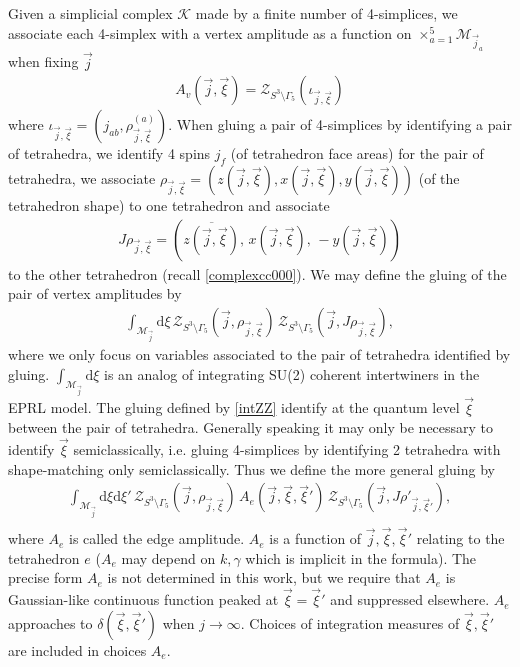 \documentclass[aps,prd,notitlepage,nofootinbib,superscriptaddress,groupedaddress,twocolumn]{revtex4-1}
\def\be{\begin{eqnarray}}
\def\ee{\end{eqnarray}}
\newcommand{\ck}{\mathcal K}
\newcommand{\cm}{\mathcal M}
\newcommand{\rmd}{\mathrm d}
\begin{document}
Given a simplicial complex $\ck$ made by a finite number of 4-simplices, we associate each 4-simplex with a vertex amplitude as a function on $\times_{a=1}^5 {\cm}_{\vec{j}_a}$ when fixing $\vec{j}$
\be
A_v(\vec{j},\vec{\xi})=\mathcal{Z}_{S^{3} \setminus \Gamma_{5}}(\iota_{\vec{j}, \vec{\xi}})
\ee 
where $\iota_{\vec{j}, \vec{\xi}}=({j}_{ab},\rho^{(a)}_{\vec{j},\vec{\xi}})$. When gluing a pair of 4-simplices by identifying a pair of tetrahedra, we identify 4 spins $j_{f}$ (of tetrahedron face areas) for the pair of tetrahedra, we associate $\rho_{\vec{j},\vec{\xi}}=(z(\vec{j}, \vec{\xi}), x(\vec{j}, \vec{\xi}), y(\vec{j}, \vec{\xi}))$ (of the tetrahedron shape) to one tetrahedron and associate 
\be
J\rho_{\vec{j},\vec{\xi}}=\left(\overline{z(\vec{j}, \vec{\xi})},\, x(\vec{j}, \vec{\xi}),\, -y(\vec{j}, \vec{\xi})\right)
\ee
to the other tetrahedron (recall \eqref{complexcc000}). We may define the gluing of the pair of vertex amplitudes by
\be
\int_{{\cm}_{\vec{j}}}\rmd \xi\,\mathcal{Z}_{S^{3} \setminus \Gamma_{5}}(\vec{j},\rho_{\vec{j},\vec{\xi}})\,\mathcal{Z}_{S^{3} \setminus \Gamma_{5}}(\vec{j},J\rho_{\vec{j},\vec{\xi}}),\label{intZZ}
\ee
where we only focus on variables associated to the pair of tetrahedra identified by gluing. $\int_{{\cm}_{\vec{j}}}\rmd \xi$ is an analog of integrating SU(2) coherent intertwiners in the EPRL model. The gluing defined by \eqref{intZZ} identify at the quantum level $\vec{\xi}$ between the pair of tetrahedra. Generally speaking it may only be necessary to identify $\vec{\xi}$ semiclassically, i.e. gluing 4-simplices by identifying 2 tetrahedra with shape-matching only semiclassically. Thus we define the more general gluing by  
\be
\int_{{\cm}_{\vec{j}}}\rmd \xi\rmd\xi'\,\mathcal{Z}_{S^{3} \setminus \Gamma_{5}}(\vec{j},\rho_{\vec{j},\vec{\xi}})\, A_e(\vec{j},\vec{\xi},\vec{\xi}')\, \mathcal{Z}_{S^{3} \setminus \Gamma_{5}}(\vec{j},J\rho'_{\vec{j},\vec{\xi}'}),\nonumber\\\label{intZZgen}
\ee
where $A_e$ is called the edge amplitude. $A_e$ is a function of $\vec{j},\vec{\xi},\vec{\xi}'$ relating to the tetrahedron $e$ ($A_e$ may depend on $k,\gamma$ which is implicit in the formula). The precise form $A_e$ is not determined in this work, but we require that $A_e$ is Gaussian-like continuous function peaked at $\vec{\xi}=\vec{\xi}'$ and suppressed elsewhere. $A_e$ approaches to $\delta(\vec{\xi},\vec{\xi}') $ when $j\to\infty$. Choices of integration measures of $\vec{\xi},\vec{\xi}'$ are included in choices $A_e$.  
\end{document}
